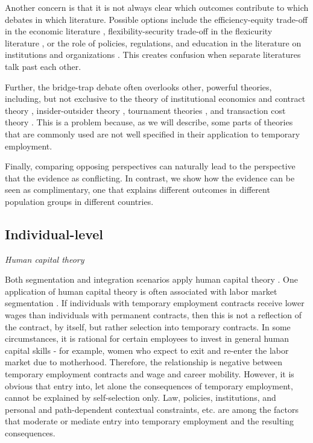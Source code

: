 \documentclass[12pt]{article}
\begin{document}
Another concern is that it is not always clear which outcomes contribute to which debates in which literature.  Possible options include the efficiency-equity trade-off in the economic literature \citep{jahn_etal_2012}, flexibility-security trade-off in the flexicurity literature \citep{muffels_2014}, or the role of policies, regulations, and education in the literature on institutions and organizations \citep{hipp_etal_2015,passaretta_wolbers_2019}.  This creates confusion when separate literatures talk past each other.

Further, the bridge-trap debate often overlooks other, powerful theories, including, but not exclusive to the theory of institutional economics and contract theory \citep{kaufman_2007}, insider-outsider theory \citep{lindbeck_snower_1989}, tournament theories \citep{lazear_rosen_1981}, and transaction cost theory \citep{williamson_1981}.  This is a problem because, as we will describe, some parts of theories that are commonly used are not well specified in their application to temporary employment.  

Finally, comparing opposing perspectives can naturally lead to the perspective that the evidence as conflicting.  In contrast, we show how the evidence can be seen as complimentary, one that explains different outcomes in different population groups in different countries.  


\subsection{Individual-level}

\emph{Human capital theory}

Both segmentation and integration scenarios apply human capital theory \citep{fuller_stecy-hildebrandt_2015}.  One application of human capital theory is often associated with labor market segmentation \citep{giesecke_gross_2003}.  If individuals with temporary employment contracts receive lower wages than individuals with permanent contracts, then this is not a reflection of the contract, by itself, but rather selection into temporary contracts.  In some circumstances, it is rational for certain employees to invest in general human capital skills - for example, women who expect to exit and re-enter the labor market due to motherhood.  Therefore, the relationship is negative between temporary employment contracts and wage and career mobility.  However, it is obvious that entry into, let alone the consequences of temporary employment, cannot be explained by self-selection only. Law, policies, institutions, and personal and path-dependent contextual constraints, etc. are among the factors that moderate or mediate entry into temporary employment and the resulting consequences.
\end{document}
